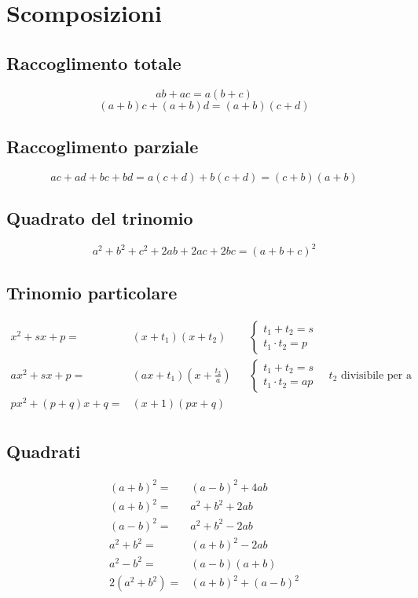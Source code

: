 \chapter{Scomposizioni}
\section{Raccoglimento totale}
\begin{equation*}
ab+ac=a(b+c)
\end{equation*}
\begin{equation*}
(a+b)c+(a+b)d=(a+b)(c+d)
\end{equation*}
\section{Raccoglimento parziale}
\begin{equation*}
ac+ad+bc+bd=a(c+d)+b(c+d)=(c+b)(a+b)
\end{equation*}
\section{Quadrato del trinomio}
\begin{equation*}
a^2+b^2+c^2+2ab+2ac+2bc=(a+b+c)^2
\end{equation*}
\section{Trinomio particolare}
\begin{align*}
x^2+sx+p={}&(x+t_1)(x+t_2)&&\begin{cases}
t_1+t_2=s\\
t_1\cdot t_2=p
\end{cases}\\
ax^2+sx+p={}&(ax+t_1)(x+\frac{t_2}{a})&&\begin{cases}
t_1+t_2=s\\
t_1\cdot t_2=ap
\end{cases}\quad \text{$t_2$ divisibile per a}\\
px^2+(p+q)x+q={}&(x+1)(px+q)\\
\end{align*}
\section{Quadrati}
\begin{align*}
(a+b)^2={}&(a-b)^2+4ab\\
(a+b)^2={}&a^2+b^2+2ab\\
(a-b)^2={}&a^2+b^2-2ab\\
a^2+b^2={}&(a+b)^2-2ab\\
a^2-b^2={}&(a-b)(a+b)\\
2(a^2+b^2)={}&(a+b)^2+(a-b)^2\\
\end{align*}

